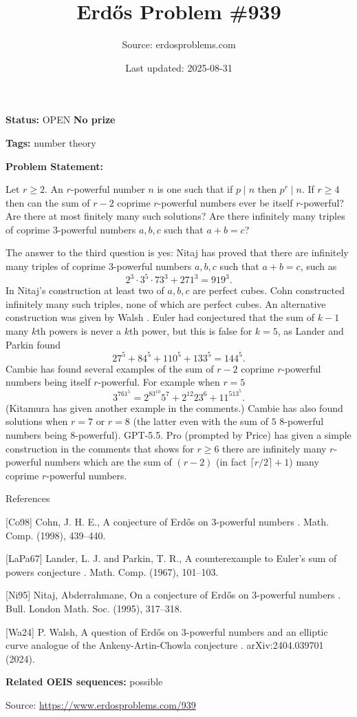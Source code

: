 \documentclass{article}
\title{Erd\H{o}s Problem \#939}
\date{Last updated: 2025-08-31}
\author{Source: erdosproblems.com}
\begin{document}
\maketitle

\noindent\textbf{Status:} OPEN \quad \textbf{No prize}

\noindent\textbf{Tags:} number theory

\medskip

\noindent\textbf{Problem Statement:}

Let $r\geq 2$. An $r$-powerful number $n$ is one such that if $p\mid n$ then $p^r\mid n$. If $r\geq 4$ then can the sum of $r-2$ coprime $r$-powerful numbers ever be itself $r$-powerful? Are there at most finitely many such solutions? Are there infinitely many triples of coprime $3$-powerful numbers $a,b,c$ such that $a+b=c$?




The answer to the third question is yes: Nitaj \cite{Ni95} has proved that there are infinitely many triples of coprime $3$-powerful numbers $a,b,c$ such that $a+b=c$, such as\[2^3\cdot 3^5\cdot 73^3+271^3 = 919^3.\]In Nitaj's construction at least two of $a,b,c$ are perfect cubes. Cohn \cite{Co98} constructed infinitely many such triples, none of which are perfect cubes. An alternative construction was given by Walsh \cite{Wa24}. Euler had conjectured that the sum of $k-1$ many $k$th powers is never a $k$th power, but this is false for $k=5$, as Lander and Parkin \cite{LaPa67} found\[27^5+84^5+110^5+133^5=144^5.\]Cambie has found several examples of the sum of $r-2$ coprime $r$-powerful numbers being itself $r$-powerful. For example when $r=5$\[3^761^5=2^83^{10}5^7+2^{12}23^6+11^513^5.\](Kitamura has given another example in the comments.) Cambie has also found solutions when $r=7$ or $r=8$ (the latter even with the sum of $5$ $8$-powerful numbers being $8$-powerful). GPT-5.5. Pro (prompted by Price) has given a simple construction in the comments that shows for $r\geq 6$ there are infinitely many $r$-powerful numbers which are the sum of $(r-2)$ (in fact $\lceil r/2\rceil+1$) many coprime $r$-powerful numbers.




References

[Co98] Cohn, J. H. E., A conjecture of {E}rd\H{o}s on {$3$}-powerful numbers . Math. Comp. (1998), 439--440.

[LaPa67] Lander, L. J. and Parkin, T. R., A counterexample to {E}uler's sum of powers conjecture . Math. Comp. (1967), 101--103.

[Ni95] Nitaj, Abderrahmane, On a conjecture of {E}rd\H{o}s on {$3$}-powerful numbers . Bull. London Math. Soc. (1995), 317--318.

[Wa24] P. Walsh, A question of Erd\H{o}s on 3-powerful numbers and an elliptic curve analogue of the Ankeny-Artin-Chowla conjecture . arXiv:2404.039701 (2024).

\noindent\textbf{Related OEIS sequences:} possible


\bigskip
\noindent\small{Source: \url{https://www.erdosproblems.com/939}}
\end{document}
